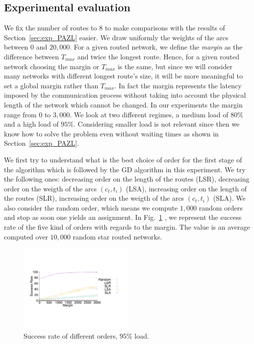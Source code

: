 \documentclass[10pt, conference, letterpaper]{IEEEtran}
\begin{document}
    \subsection{Experimental evaluation}
    \label{sec:resultsPALL}
    
    We fix the number of routes to $8$ to make comparisons with the results of Section~\ref{sec:exp_PAZL} easier. 
    We draw uniformly the weights of the arcs between $0$ and $20,000$.
    For a given routed network, we define the {\em margin} as the difference between $T_{max}$ and twice the longest route. 
    Hence, for a given routed network choosing the margin or $T_{max}$ is the same, but since we will consider many networks with different longest route's size, it will be more meaningful to set a global margin rather than $T_{max}$.
    In fact the margin represents the latency imposed by the communication process without taking into account the physical length of the network which cannot be changed. In our experiments the margin range from  $0$ to $3,000$.
   We look at two different regimes, a medium load of $80\%$ and a high load of $95\%$.
   Considering smaller load is not relevant since then we know how to solve the problem even without waiting times as shown in Section~\ref{sec:exp_PAZL}. 
   
   We first try to understand what is the best choice of order for the first stage of the algorithm which is followed by the GD algorithm in this experiment. We try the following ones: decreasing order on the length of the routes (LSR), decreasing order on the weigth of the arcs $(c_t,t_i)$ (LSA), increasing order on the length of the routes (SLR), increasing order on the weigth of the arcs $(c_t,t_i)$ (SLA). We also consider the random order, which means we compute $1,000$ random orders and stop as soon one yields an assignment.
   In Fig.~\ref{fig:success95} , we represent the success rate of the five kind of orders with regards to the margin. The value is an average computed over $10,000$ random star routed networks.

\begin{figure}[h] 
  \centering
    \includegraphics[width=0.5\textwidth]{departs_gp_21000.pdf}
       \vspace{-0.5cm}
      \caption{Success rate of different orders, $95\%$ load.}
      \label{fig:success95}
          \end{figure}
\end{document}
